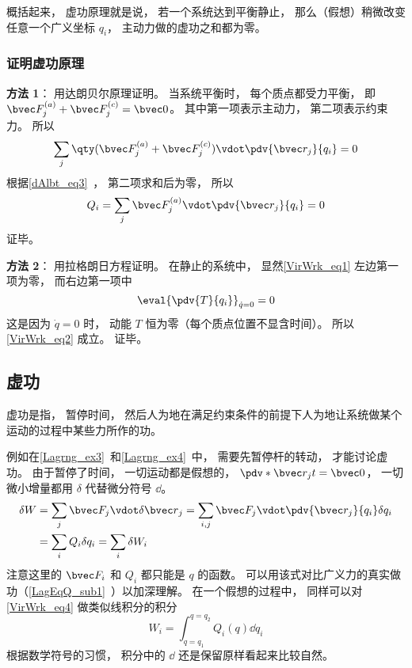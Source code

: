 概括起来， 虚功原理就是说， 若一个系统达到平衡静止， 那么（假想）稍微改变任意一个广义坐标 $q_i$， 主动力做的虚功之和都为零。

\subsubsection{证明虚功原理}
\textbf{方法 1}： 用达朗贝尔原理证明。 当系统平衡时， 每个质点都受力平衡， 即 $\bvec F_j^{(a)}+\bvec F_j^{(c)} = \bvec 0$。 其中第一项表示主动力，  第二项表示约束力。 所以
\begin{equation}
\sum_j \qty(\bvec F_j^{(a)}+\bvec F_j^{(c)}) \vdot \pdv{\bvec r_j}{q_i} = 0
\end{equation}
根据\autoref{dAlbt_eq3}~， 第二项求和后为零， 所以
\begin{equation}
Q_i = \sum_j \bvec F_j^{(a)} \vdot \pdv{\bvec r_j}{q_i} = 0
\end{equation}
证毕。

\textbf{方法 2}： 用拉格朗日方程证明。 在静止的系统中， 显然\autoref{VirWrk_eq1} 左边第一项为零， 而右边第一项中
\begin{equation}
\eval{\pdv{T}{q_i}}_{\dot q = 0} = 0
\end{equation}
这是因为 $\dot q = 0$ 时， 动能 $T$ 恒为零（每个质点位置不显含时间）。 所以\autoref{VirWrk_eq2} 成立。 证毕。

\subsection{虚功}\label{VirWrk_sub1}
虚功是指， 暂停时间， 然后人为地在满足约束条件的前提下人为地让系统做某个运动的过程中某些力所作的功。

例如在\autoref{Lagrng_ex3}~和\autoref{Lagrng_ex4}~中， 需要先暂停杆的转动， 才能讨论虚功。 由于暂停了时间， 一切运动都是假想的， $\pdv*{\bvec r_j}{t} = \bvec 0$， 一切微小增量都用 $\delta$ 代替微分符号 $\dd{}$。
\begin{equation}\label{VirWrk_eq4}
\begin{aligned}
\delta{W} &= \sum_j \bvec F_j \vdot \delta{\bvec r}_j
= \sum_{i,j} \bvec F_j \vdot \pdv{\bvec r_j}{q_i}\delta q_i\\
&= \sum_i Q_i \delta q_i = \sum_i \delta{W_i}
\end{aligned}
\end{equation}
注意这里的 $\bvec F_i$ 和 $Q_i$ 都只能是 $q$ 的函数。 可以用该式对比广义力的真实做功（\autoref{LagEqQ_sub1}~）以加深理解。 在一个假想的过程中， 同样可以对\autoref{VirWrk_eq4} 做类似线积分的积分
\begin{equation}
W_i = \int_{q=q_1}^{q=q_2} Q_i(q) \dd q_i
\end{equation}
根据数学符号的习惯， 积分中的 $\dd{}$ 还是保留原样看起来比较自然。
